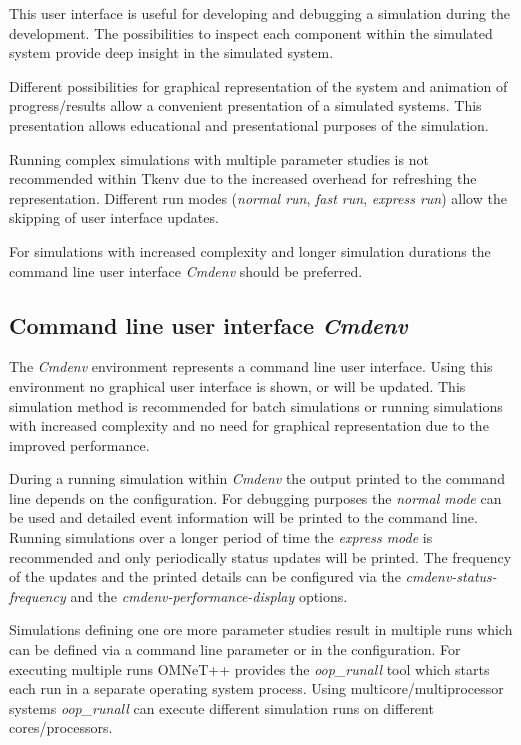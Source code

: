 This user interface is useful for developing and debugging a simulation during the development.
The possibilities to inspect each component within the simulated system provide deep insight in the simulated system.

Different possibilities for graphical representation of the system and animation of progress/results allow a convenient presentation of a simulated systems.
This presentation allows educational and presentational purposes of the simulation. \cite[section 7.1]{omnet_user_guide}

Running complex simulations with multiple parameter studies is not recommended within Tkenv due to the increased overhead for refreshing the representation.
Different run modes (\emph{normal run}, \emph{fast run}, \emph{express run}) allow the skipping of user interface updates. \cite[section 7.3.2]{omnet_user_guide}

For simulations with increased complexity and longer simulation durations the command line user interface \emph{Cmdenv} should be preferred.

\subsection{Command line user interface \emph{Cmdenv}}
\label{sec:omnet_running_cmdenv}
The \emph{Cmdenv} environment represents a command line user interface.
Using this environment no graphical user interface is shown, or will be updated.
This simulation method is recommended for batch simulations or running simulations with increased complexity and no need for graphical representation due to the improved performance.

During a running simulation within \emph{Cmdenv} the output printed to the command line depends on the configuration.
For debugging purposes the \emph{normal mode} can be used and detailed event information will be printed to the command line.
Running simulations over a longer period of time the \emph{express mode} is recommended and only periodically status updates will be printed.
The frequency of the updates and the printed details can be configured via the \emph{cmdenv-status-frequency} and the \emph{cmdenv-performance-display} options. \cite[section 10.2.3]{omnet_manual}

Simulations defining one ore more parameter studies result in multiple runs which can be defined via a command line parameter or in the configuration.
For executing multiple runs OMNeT++ provides the \emph{oop\_runall} tool which starts each run in a separate operating system process.
Using multicore/multiprocessor systems \emph{oop\_runall} can execute different simulation runs on different cores/processors. \cite[section 10.4.3]{omnet_manual}
\\

